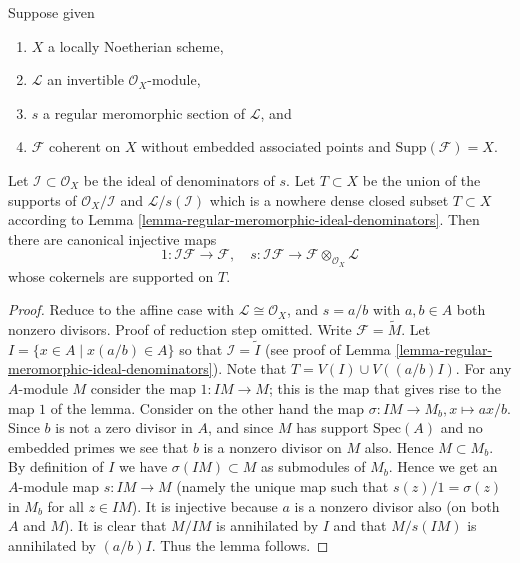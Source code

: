 \begin{lemma}
\label{lemma-make-maps-regular-section}
Suppose given
\begin{enumerate}
\item $X$ a locally Noetherian scheme,
\item $\mathcal{L}$ an invertible $\mathcal{O}_X$-module,
\item $s$ a regular meromorphic section of $\mathcal{L}$, and
\item $\mathcal{F}$ coherent on $X$
without embedded associated points and $\text{Supp}(\mathcal{F}) = X$.
\end{enumerate}
Let $\mathcal{I} \subset \mathcal{O}_X$ be the ideal of
denominators of $s$. Let $T \subset X$ be the union
of the supports of $\mathcal{O}_X/\mathcal{I}$ and
$\mathcal{L}/s(\mathcal{I})$ which is a nowhere dense closed
subset $T \subset X$ according to
Lemma \ref{lemma-regular-meromorphic-ideal-denominators}.
Then there are canonical injective maps
$$
1 : \mathcal{I}\mathcal{F} \to \mathcal{F},\quad
s : \mathcal{I}\mathcal{F} \to \mathcal{F}\otimes_{\mathcal{O}_X}\mathcal{L}
$$
whose cokernels are supported on $T$.
\end{lemma}

\begin{proof}
Reduce to the affine case with $\mathcal{L} \cong \mathcal{O}_X$,
and $s = a/b$ with $a, b \in A$ both nonzero divisors.
Proof of reduction step omitted.
Write $\mathcal{F} = \widetilde{M}$.
Let $I = \{x \in A \mid x(a/b) \in A\}$
so that $\mathcal{I} = \widetilde{I}$ (see
proof of Lemma \ref{lemma-regular-meromorphic-ideal-denominators}).
Note that $T = V(I) \cup V((a/b)I)$.
For any $A$-module $M$ consider the map $1 : IM \to M$; this is the
map that gives rise to the map $1$ of the lemma.
Consider on the other hand the map
$\sigma : IM \to M_b, x \mapsto ax/b$.
Since $b$ is not a zero divisor in $A$, and since
$M$ has support $\text{Spec}(A)$ and no embedded primes we
see that $b$ is a nonzero divisor on $M$ also. Hence $M \subset M_b$.
By definition of $I$ we have $\sigma(IM) \subset M$ as submodules
of $M_b$. Hence we get an $A$-module map $s : IM \to M$ (namely the
unique map such that $s(z)/1 = \sigma(z)$ in $M_b$ for all $z \in IM$).
It is injective because $a$ is a nonzero divisor also (on both $A$ and $M$).
It is clear that $M/IM$ is annihilated by $I$ and that
$M/s(IM)$ is annihilated by $(a/b)I$. Thus the lemma follows.
\end{proof}
























